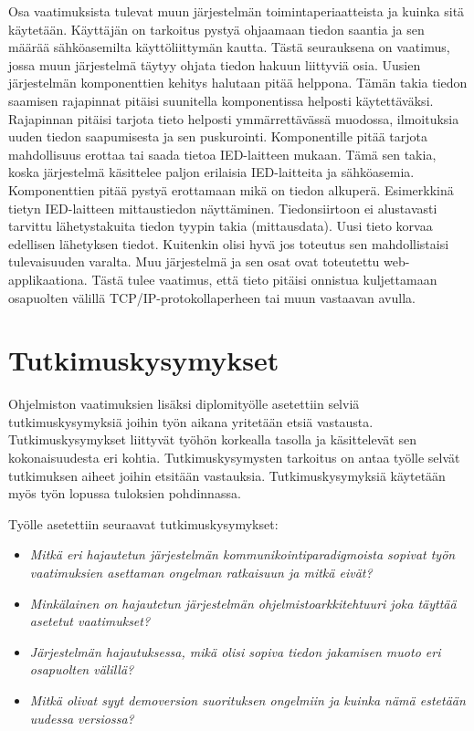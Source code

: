 Osa vaatimuksista tulevat muun järjestelmän toimintaperiaatteista ja kuinka sitä käytetään. Käyttäjän on tarkoitus pystyä ohjaamaan tiedon saantia ja sen määrää sähköasemilta käyttöliittymän kautta. Tästä seurauksena on vaatimus, jossa muun järjestelmä täytyy ohjata tiedon hakuun liittyviä osia. Uusien järjestelmän komponenttien kehitys halutaan pitää helppona. Tämän takia tiedon saamisen rajapinnat pitäisi suunitella komponentissa helposti käytettäväksi. Rajapinnan pitäisi tarjota tieto helposti ymmärrettävässä muodossa, ilmoituksia uuden tiedon saapumisesta ja sen puskurointi. Komponentille pitää tarjota mahdollisuus erottaa tai saada tietoa IED-laitteen mukaan. Tämä sen takia, koska järjestelmä käsittelee paljon erilaisia IED-laitteita ja sähköasemia. Komponenttien pitää pystyä erottamaan mikä on tiedon alkuperä. Esimerkkinä tietyn IED-laitteen mittaustiedon näyttäminen. Tiedonsiirtoon ei alustavasti tarvittu lähetystakuita tiedon tyypin takia (mittausdata). Uusi tieto korvaa edellisen lähetyksen tiedot. Kuitenkin olisi hyvä jos toteutus sen mahdollistaisi tulevaisuuden varalta. Muu järjestelmä ja sen osat ovat toteutettu web-applikaationa. Tästä tulee vaatimus, että tieto pitäisi onnistua kuljettamaan osapuolten välillä TCP/IP-protokollaperheen tai muun vastaavan avulla.


\section{Tutkimuskysymykset}
Ohjelmiston vaatimuksien lisäksi diplomityölle asetettiin selviä tutkimuskysymyksiä joihin työn aikana yritetään etsiä vastausta. Tutkimuskysymykset liittyvät työhön korkealla tasolla ja käsittelevät sen kokonaisuudesta eri kohtia. Tutkimuskysymysten tarkoitus on antaa työlle selvät tutkimuksen aiheet joihin etsitään vastauksia. Tutkimuskysymyksiä käytetään myös työn lopussa tuloksien pohdinnassa.

Työlle asetettiin seuraavat tutkimuskysymykset:
\begin{itemize}
	\item \emph{Mitkä eri hajautetun järjestelmän kommunikointiparadigmoista sopivat työn vaatimuksien asettaman ongelman ratkaisuun ja mitkä eivät?}
	\item \emph{Minkälainen on hajautetun järjestelmän ohjelmistoarkkitehtuuri joka täyttää asetetut vaatimukset?}
	\item \emph{Järjestelmän hajautuksessa, mikä olisi sopiva tiedon jakamisen muoto eri osapuolten välillä?}
	\item \emph{Mitkä olivat syyt demoversion suorituksen ongelmiin ja kuinka nämä estetään uudessa versiossa?}
\end{itemize}